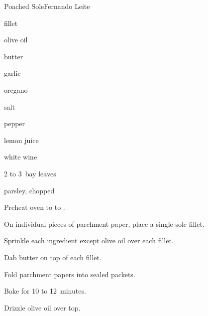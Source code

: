 \begin{recipe}{Poached Sole}{Fernando Leite}{}

\begin{ingredients}
\item {} fillet
\item olive oil
\item butter
\item garlic
\item oregano
\item salt
\item pepper
\item lemon juice
\item white wine
\item 2 to 3~bay leaves
\item parsley, chopped
\end{ingredients}

\begin{directions}
\item Preheat oven to  to .
\item On individual pieces of parchment paper, place a single sole fillet.
\item Sprinkle each ingredient except olive oil over each fillet.
\item Dab butter on top of each fillet.
\item Fold parchment papers into sealed packets.
\item Bake for 10 to 12~minutes.
\item Drizzle olive oil over top.
\end{directions}

\end{recipe}
